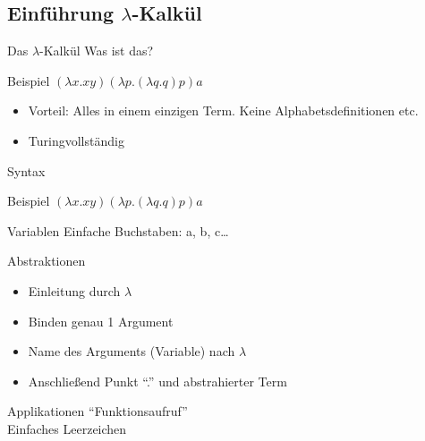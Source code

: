 \documentclass[18pt]{beamer}
\begin{document}
	\subsection{Einführung $\lambda$-Kalkül}
	\begin{frame}[<+->]{Das $\lambda$-Kalkül}
		Was ist das?
		\begin{exampleblock}{Beispiel}
			$(\lambda x.x y) (\lambda p.(\lambda q.q) p) a$
		\end{exampleblock}
		\begin{itemize}
			\item Vorteil: Alles in einem einzigen Term. Keine Alphabetsdefinitionen etc.
			\item Turingvollständig
		\end{itemize}
	\end{frame}
	
	\begin{frame}{Syntax}
		\begin{exampleblock}{Beispiel}
			$(\lambda x.x y) (\lambda p.(\lambda q.q) p) a$
		\end{exampleblock}
		\pause
		\begin{block}{Variablen}
			Einfache Buchstaben: a, b, c\dots \\
		\end{block}
		\pause
		\begin{block}{Abstraktionen}
			\begin{itemize}
				\item Einleitung durch $\lambda$
				\item Binden genau 1 Argument
				\item Name des Arguments (Variable) nach $\lambda$
				\item Anschließend Punkt "`."' und abstrahierter Term
			\end{itemize}
		\end{block}
		\pause
		\begin{block}{Applikationen}
			"`Funktionsaufruf"'\\
			Einfaches Leerzeichen
		\end{block}
	\end{frame}
\end{document}
